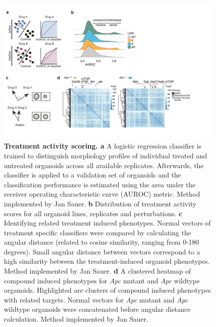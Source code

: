 \begin{flushleft}
\begin{figure}[h!]
\centering
\includegraphics[width=\textwidth,
                height=\textheight,
                keepaspectratio]{figures/adenomaprofiling/pdf/fig_1_5_2.pdf}
\caption[Treatment activity scoring]{\textbf{Treatment activity scoring. a} A logistic regression classifier is trained to distinguish morphology profiles of individual treated and untreated organoids across all available replicates. Afterwards, the classifier is applied to a validation set of organoids and the classification performance is estimated using the area under the receiver operating characteristic curve (AUROC) metric. Method implemented by Jan Sauer.
\textbf{b} Distribution of treatment activity scores for all organoid lines, replicates and perturbations. 
\textbf{c} Identifying related treatment induced phenotypes. Normal vectors of treatment specific classifiers were compared by calculating the angular distance (related to cosine similarity, ranging from 0-180 degrees). Small angular distance between vectors correspond to a high similarity between the treatment-induced organoid phenotypes. Method implemented by Jan Sauer.
\textbf{d} A clustered heatmap of compound induced phenotypes for \textit{Apc} mutant and \textit{Apc} wildtype organoids. Highlighted are clusters of compound induced phenotypes with related targets. Normal vectors for \textit{Apc} mutant and \textit{Apc} wildtype organoids were concatenated before angular distance calculation. Method implemented by Jan Sauer.
}
\label{fig_150}
\end{figure}
\bigbreak


\end{flushleft}
